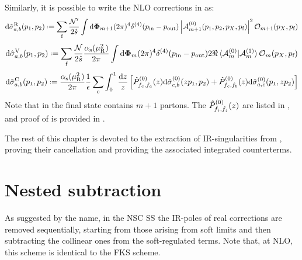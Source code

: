 Similarly, it is possible to write the NLO corrections in  as:
\begin{equation}
  \dd\pcs_{a,b}^\text{R}(p_1 , p_2) \defeq \sum_\text{f} \frac{\mathcal{N}'}{2\hat{s}} \int \lps_{m+1} (2\pi)^4 \delta^{(4)}(p_\text{in} - p_\text{out}) \abs{\ampl^{(0)}_{m+1}(p_1, p_2, p_X, p_\text{f})}^2 \op_{m+1}(p_X, p_\text{f})
  \label{eq:real-cs}
\end{equation}
\begin{equation}
  \dd\pcs_{a,b}^\text{V}(p_1 , p_2) \defeq \sum_\text{f} \frac{\mathcal{N}}{2\hat{s}} \frac{\rcr}{2\pi} \int \lps_m (2\pi)^4 \delta^{(4)}(p_\text{in} - p_\text{out}) 2\Re \braket{\ampl_m^{(0)} | \ampl_m^{(1)}} \op_m(p_X, p_\text{f})
  \label{eq:virt-cs}
\end{equation}
\begin{equation}
  \dd\pcs_{a,b}^\text{C}(p_1 , p_2) \defeq \frac{\rcr}{2\pi} \frac{1}{\de} \sum_c \int_0^1 \frac{\dd z}{z} \left[ \ap_{f_c,f_a}(z) \dd\pcs_{c,b}^{(0)}(z p_1 , p_2) + \ap_{f_c,f_b}(z) \dd\pcs_{a,c}^{(0)}(p_1 , z p_2) \right]
  \label{eq:pdf-cs}
\end{equation}
Note that in  the final state contains $ m + 1 $ partons. The  $ \hat{P}^{(0)}_{f_i , f_j}(z) $ are listed in , and proof of  is provided in .

The rest of this chapter is devoted to the extraction of IR-singularities from , proving their cancellation and providing the associated integrated counterterms.

\section{Nested subtraction}
\label{sec:nsc-real}

As suggested by the name, in the NSC SS the IR-poles of real corrections are removed sequentially, starting from those arising from soft limits and then subtracting the collinear ones from the soft-regulated terms. Note that, at NLO, this scheme is identical to the FKS scheme.

